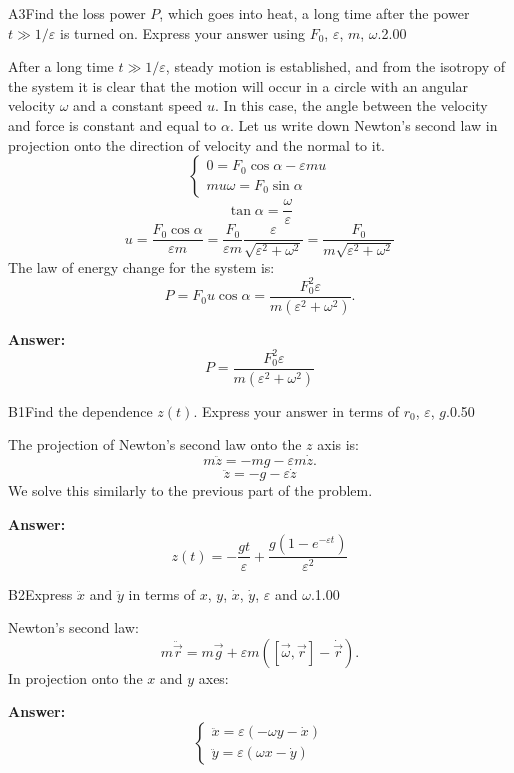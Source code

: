 \documentclass[11pt,a4paper]{article}
\begin{document}
\begin{solcard}{A3}{Find the loss power $P$, which goes into heat, a long time after the power $t\gg1/\varepsilon$ is turned on. Express your answer using $F_0$, $\varepsilon$, $m$, $\omega$.}{2.00}

After a long time $t\gg 1/\varepsilon$, steady motion is established, and from the isotropy of the system it is clear that the motion will occur in a circle with an angular velocity $\omega$ and a constant speed $u$. In this case, the angle between the velocity and force is constant and equal to $\alpha$. Let us write down Newton's second law in projection onto the direction of velocity and the normal to it. $$\begin{cases}0 = F_0 \cos\alpha - \varepsilon m u\\ mu\omega = F_0 \sin \alpha \end{cases}$$$$\tan \alpha = \frac{\omega}{\varepsilon}$$$$u = \frac{F_0\cos\alpha}{\varepsilon m} = \frac{F_0}{\varepsilon m} \frac{\varepsilon}{\sqrt{\varepsilon^2+\omega^2}} = \frac{F_0}{m\sqrt{\varepsilon^2+\omega^2}}$$The law of energy change for the system is: $$P = F_0 u \cos\alpha = \frac{F_0^2\varepsilon}{m\left(\varepsilon^2+\omega^2\right)}.$$

\par\smallskip\noindent\textbf{Answer:} $$P =  \frac{F_0^2\varepsilon}{m\left(\varepsilon^2+\omega^2\right)}$$
\end{solcard}

\begin{solcard}{B1}{Find the dependence $z(t)$. Express your answer in terms of $r_0$, $\varepsilon$, $g$.}{0.50}

The projection of Newton's second law onto the $z$ axis is: $$m\ddot{z} = -mg - \varepsilon m\dot z.$$$$\ddot{z} = -g - \varepsilon \dot z$$We solve this similarly to the previous part of the problem.

\par\smallskip\noindent\textbf{Answer:} $$z(t) = -\frac{gt}{\varepsilon}+\frac{g\left(1-e^{-\varepsilon t}\right)}{\varepsilon^2}$$
\end{solcard}

\begin{solcard}{B2}{Express $\ddot{x}$ and $\ddot{y}$ in terms of $x$, $y$, $\dot x$, $\dot y$, $\varepsilon$ and $\omega$.}{1.00}

Newton's second law: $$m\ddot{\vec r} = m\vec g + \varepsilon m\left(\left[\vec\omega, \vec r\right] - \dot{\vec r}\right).$$In projection onto the $x$ and $y$ axes:

\par\smallskip\noindent\textbf{Answer:} $$\begin{cases} \ddot{x}=\varepsilon\left(-\omega y - \dot x\right)\\ \ddot y =\varepsilon\left(\omega x - \dot y\right) \end{cases}$$
\end{solcard}
\end{document}
